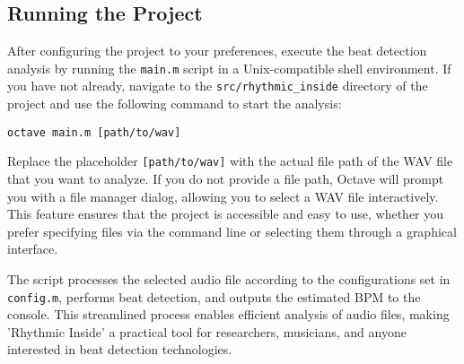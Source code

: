 \subsection{Running the Project}

After configuring the project to your preferences, execute the beat detection analysis by running the \texttt{main.m} script in a Unix-compatible shell environment.  If you have not already, navigate to the \texttt{src/rhythmic\_inside} directory of the project and use the following command to start the analysis:

\lstset{style=ShellStyle}
\begin{lstlisting}[caption={Running the project}, label=lst]
octave main.m [path/to/wav]
\end{lstlisting}

Replace the placeholder \texttt{[path/to/wav]} with the actual file path of the WAV file that you want to analyze.  If you do not provide a file path, Octave will prompt you with a file manager dialog, allowing you to select a WAV file interactively. This feature ensures that the project is accessible and easy to use, whether you prefer specifying files via the command line or selecting them through a graphical interface.

The script processes the selected audio file according to the configurations set in \texttt{config.m}, performs beat detection, and outputs the estimated BPM to the console.  This streamlined process enables efficient analysis of audio files, making 'Rhythmic Inside' a practical tool for researchers, musicians, and anyone interested in beat detection technologies.
